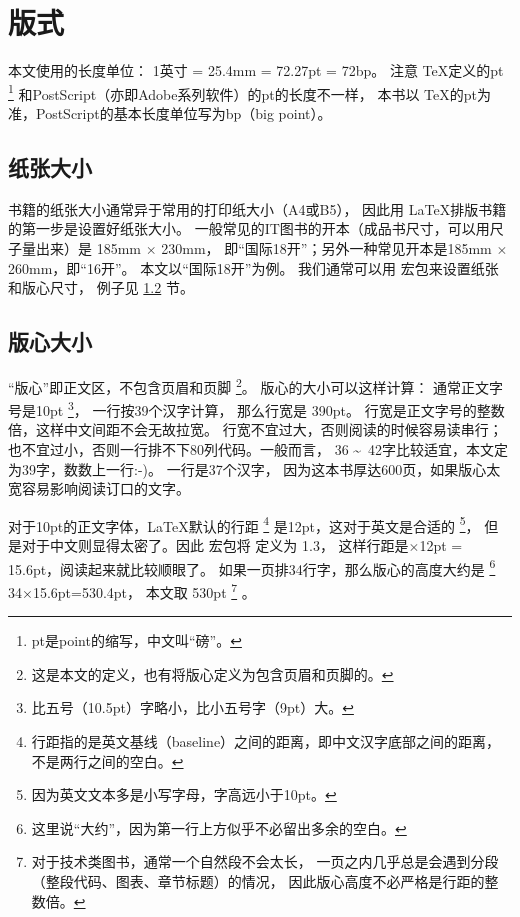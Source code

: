 \chapter{版式}

本文使用的长度单位：
1英寸 = 25.4mm = 72.27pt = 72bp。
注意 \TeX 定义的pt\nolinebreak
\footnote{pt是point的缩写，中文叫“磅”。} 和PostScript（亦即Adobe系列软件）的pt的长度不一样，
本书以 \TeX 的pt为准，PostScript的基本长度单位写为bp（big point）。

\section{纸张大小} %

书籍的纸张大小通常异于常用的打印纸大小（A4或B5），
因此用 \LaTeX 排版书籍的第一步是设置好纸张大小。
一般常见的IT图书的开本（成品书尺寸，可以用尺子量出来）是 185mm $\times$ 230mm，
即“国际18开”；另外一种常见开本是185mm $\times$ 260mm，即“16开”。
本文以“国际18开”为例。
我们通常可以用  宏包来设置纸张和版心尺寸，
例子见 \ref{sec:textbody} 节。

\section{版心大小} %
\label{sec:textbody}

“版心”即正文区，不包含页眉和页脚
\footnote{这是本文的定义，也有将版心定义为包含页眉和页脚的。}。
版心的大小可以这样计算：
通常正文字号是10pt
\footnote{比五号（10.5pt）字略小，比小五号字（9pt）大。}，
一行按39个汉字计算，
那么行宽是 390pt。
行宽是正文字号的整数倍，这样中文间距不会无故拉宽。
行宽不宜过大，否则阅读的时候容易读串行；
也不宜过小，否则一行排不下80列代码。一般而言，
36 \textasciitilde\ 42字比较适宜，本文定为39字，数数上一行:-)。
\mybooktitle 一行是37个汉字，
因为这本书厚达600页，如果版心太宽容易影响阅读订口的文字。

对于10pt的正文字体，\LaTeX 默认的行距
\footnote{行距指的是英文基线（baseline）之间的距离，即中文汉字底部之间的距离，
不是两行之间的空白。} 是12pt，这对于英文是合适的
\footnote{因为英文文本多是小写字母，字高远小于10pt。}，
但是对于中文则显得太密了。因此 \CTeX 宏包将  定义为 1.3，
这样行距是$\times$12pt = 15.6pt，阅读起来就比较顺眼了。
如果一页排34行字，那么版心的高度大约是 \nolinebreak
\footnote{这里说“大约”，因为第一行上方似乎不必留出多余的空白。} 34$\times$15.6pt=530.4pt，
本文取 530pt
\footnote{对于技术类图书，通常一个自然段不会太长，
一页之内几乎总是会遇到分段（整段代码、图表、章节标题）的情况，
因此版心高度不必严格是行距的整数倍。} 。

